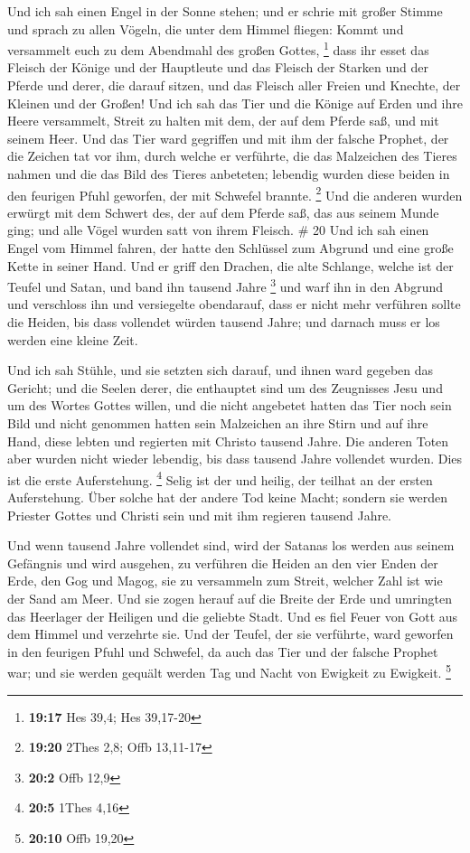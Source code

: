  Und ich sah einen Engel in der Sonne stehen; und er schrie
mit großer Stimme und sprach zu allen Vögeln, die unter dem Himmel
fliegen: Kommt und versammelt euch zu dem Abendmahl des großen Gottes,
\footnote{\textbf{19:17} Hes 39,4; Hes 39,17-20}  dass ihr
esset das Fleisch der Könige und der Hauptleute und das Fleisch der
Starken und der Pferde und derer, die darauf sitzen, und das Fleisch
aller Freien und Knechte, der Kleinen und der Großen!  Und
ich sah das Tier und die Könige auf Erden und ihre Heere versammelt,
Streit zu halten mit dem, der auf dem Pferde saß, und mit seinem Heer.
 Und das Tier ward gegriffen und mit ihm der falsche
Prophet, der die Zeichen tat vor ihm, durch welche er verführte, die das
Malzeichen des Tieres nahmen und die das Bild des Tieres anbeteten;
lebendig wurden diese beiden in den feurigen Pfuhl geworfen, der mit
Schwefel brannte. \footnote{\textbf{19:20} 2Thes 2,8; Offb 13,11-17}
 Und die anderen wurden erwürgt mit dem Schwert des, der
auf dem Pferde saß, das aus seinem Munde ging; und alle Vögel wurden
satt von ihrem Fleisch. \# 20  Und ich sah einen Engel vom
Himmel fahren, der hatte den Schlüssel zum Abgrund und eine große Kette
in seiner Hand.  Und er griff den Drachen, die alte
Schlange, welche ist der Teufel und Satan, und band ihn tausend Jahre
\footnote{\textbf{20:2} Offb 12,9}  und warf ihn in den
Abgrund und verschloss ihn und versiegelte obendarauf, dass er nicht
mehr verführen sollte die Heiden, bis dass vollendet würden tausend
Jahre; und darnach muss er los werden eine kleine Zeit.

 Und ich sah Stühle, und sie setzten sich darauf, und ihnen
ward gegeben das Gericht; und die Seelen derer, die enthauptet sind um
des Zeugnisses Jesu und um des Wortes Gottes willen, und die nicht
angebetet hatten das Tier noch sein Bild und nicht genommen hatten sein
Malzeichen an ihre Stirn und auf ihre Hand, diese lebten und regierten
mit Christo tausend Jahre.  Die anderen Toten aber wurden
nicht wieder lebendig, bis dass tausend Jahre vollendet wurden. Dies ist
die erste Auferstehung. \footnote{\textbf{20:5} 1Thes 4,16} 
Selig ist der und heilig, der teilhat an der ersten Auferstehung. Über
solche hat der andere Tod keine Macht; sondern sie werden Priester
Gottes und Christi sein und mit ihm regieren tausend Jahre.

 Und wenn tausend Jahre vollendet sind, wird der Satanas los
werden aus seinem Gefängnis  und wird ausgehen, zu verführen
die Heiden an den vier Enden der Erde, den Gog und Magog, sie zu
versammeln zum Streit, welcher Zahl ist wie der Sand am Meer.
 Und sie zogen herauf auf die Breite der Erde und umringten
das Heerlager der Heiligen und die geliebte Stadt. Und es fiel Feuer von
Gott aus dem Himmel und verzehrte sie.  Und der Teufel, der
sie verführte, ward geworfen in den feurigen Pfuhl und Schwefel, da auch
das Tier und der falsche Prophet war; und sie werden gequält werden Tag
und Nacht von Ewigkeit zu Ewigkeit. \footnote{\textbf{20:10} Offb 19,20}

